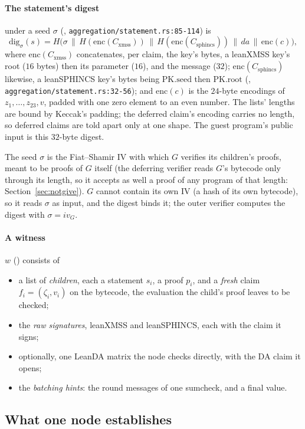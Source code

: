 \documentclass[11pt]{article}
\newcommand{\Cx}{C_{\mathrm{xmss}}}
\newcommand{\Cs}{C_{\mathrm{sphincs}}}
\newcommand{\enc}{\mathrm{enc}}
\begin{document}
\paragraph{The statement's digest} under a seed $\sigma$ (,
\texttt{aggregation/statement.rs:85-114}) is
\[
\mathrm{dig}_\sigma(s) = H\big(\sigma \,\|\, H(\enc(\Cx)) \,\|\, H(\enc(\Cs)) \,\|\, \mathit{da} \,\|\, \enc(c)\big),
\]
where $\enc(\Cx)$ concatenates, per claim, the key's bytes, a leanXMSS key's root ($16$ bytes)
then its parameter ($16$), and the message ($32$); $\enc(\Cs)$ likewise, a leanSPHINCS key's bytes
being $\mathrm{PK.seed}$ then $\mathrm{PK.root}$ (,
\texttt{aggregation/statement.rs:32-56}); and $\enc(c)$ is the $24$-byte encodings of
$z_1, \dots, z_{23}, v$,
padded with one zero element to an even number. The lists' lengths are bound by Keccak's padding;
the deferred claim's encoding carries no length, so deferred claims are told apart only at one
shape. The guest program's public input is this $32$-byte digest.

The seed $\sigma$ is the Fiat--Shamir IV with which $G$ verifies its children's proofs, meant to be
proofs of $G$ itself (the deferring verifier reads $G$'s bytecode only through its length, so it
accepts as well a proof of any program of that length: Section~\ref{sec:notgive}). $G$ cannot contain its own IV (a hash of its own bytecode), so it reads
$\sigma$ as input, and the digest binds it; the outer verifier computes the digest with
$\sigma = iv_G$.

\paragraph{A witness} $w$ () consists of
\begin{itemize}
\item a list of \emph{children}, each a statement $s_i$, a proof $p_i$, and a \emph{fresh} claim
$f_i = (\zeta_i, v_i)$ on the bytecode, the evaluation the child's proof leaves to be checked;
\item the \emph{raw signatures}, leanXMSS and leanSPHINCS, each with the claim it signs;
\item optionally, one LeanDA matrix the node checks directly, with the DA claim it opens;
\item the \emph{batching hints}: the round messages of one sumcheck, and a final value.
\end{itemize}

\subsection{What one node establishes}
\end{document}
